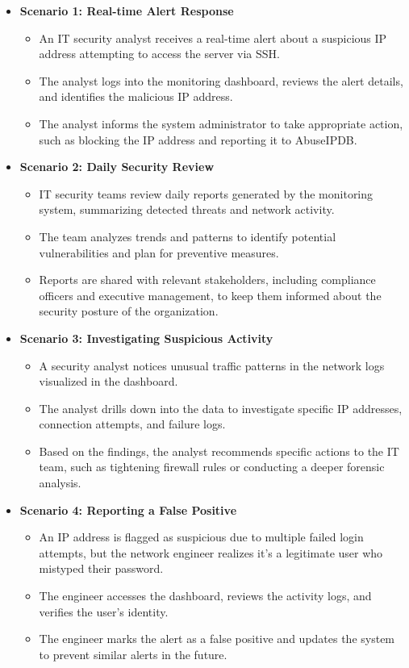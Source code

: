 \documentclass{article}
\begin{document}
    \begin{itemize}
        \item \textbf{Scenario 1: Real-time Alert Response}
        \begin{itemize}
            \item An IT security analyst receives a real-time alert about a suspicious IP address attempting to access the server via SSH\@.
            \item The analyst logs into the monitoring dashboard, reviews the alert details, and identifies the malicious IP address.
            \item The analyst informs the system administrator to take appropriate action, such as blocking the IP address and reporting it to AbuseIPDB\@.
        \end{itemize}

        \item \textbf{Scenario 2: Daily Security Review}
        \begin{itemize}
            \item IT security teams review daily reports generated by the monitoring system, summarizing detected threats and network activity.
            \item The team analyzes trends and patterns to identify potential vulnerabilities and plan for preventive measures.
            \item Reports are shared with relevant stakeholders, including compliance officers and executive management, to keep them informed about the security posture of the organization.
        \end{itemize}

        \item \textbf{Scenario 3: Investigating Suspicious Activity}
        \begin{itemize}
            \item A security analyst notices unusual traffic patterns in the network logs visualized in the dashboard.
            \item The analyst drills down into the data to investigate specific IP addresses, connection attempts, and failure logs.
            \item Based on the findings, the analyst recommends specific actions to the IT team, such as tightening firewall rules or conducting a deeper forensic analysis.
        \end{itemize}

        \item \textbf{Scenario 4: Reporting a False Positive}
        \begin{itemize}
            \item An IP address is flagged as suspicious due to multiple failed login attempts, but the network engineer realizes it's a legitimate user who mistyped their password.
            \item The engineer accesses the dashboard, reviews the activity logs, and verifies the user's identity.
            \item The engineer marks the alert as a false positive and updates the system to prevent similar alerts in the future.
        \end{itemize}


\end{itemize}
\end{document}
